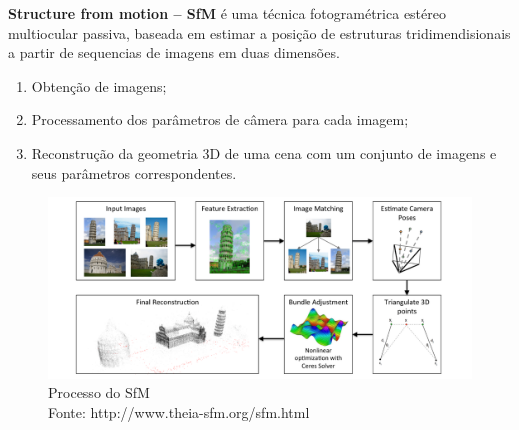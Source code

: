 \documentclass[table, usenames, svgnames, xcolor=dvipsnames]{beamer}
\begin{document}
\begin{frame}
	\begin{center}
	\textbf{Structure from motion -- SfM} é uma técnica fotogramétrica estéreo multiocular passiva, baseada em estimar a posição de estruturas tridimendisionais  a partir de sequencias de imagens em duas dimensões. 
	\end{center}
\end{frame}

\begin{frame}
	\begin{center}
		\begin{enumerate}
			\item{Obtenção de imagens;}
			\item{Processamento dos parâmetros de câmera para cada imagem;}
			\item{Reconstrução da geometria 3D de uma cena com um conjunto de imagens e seus parâmetros correspondentes.}
		\end{enumerate}
	\end{center}
\end{frame}

\begin{frame}
	\begin{center}
		\begin{figure}[!h]
			\centering
			\includegraphics[width=1\linewidth]{figs/pipelinesfm.png}
			\caption{%
				Processo do SfM \\
			\tiny{Fonte: http://www.theia-sfm.org/sfm.html}
			}
		\end{figure}	
	\end{center}
\end{frame}
\end{document}
